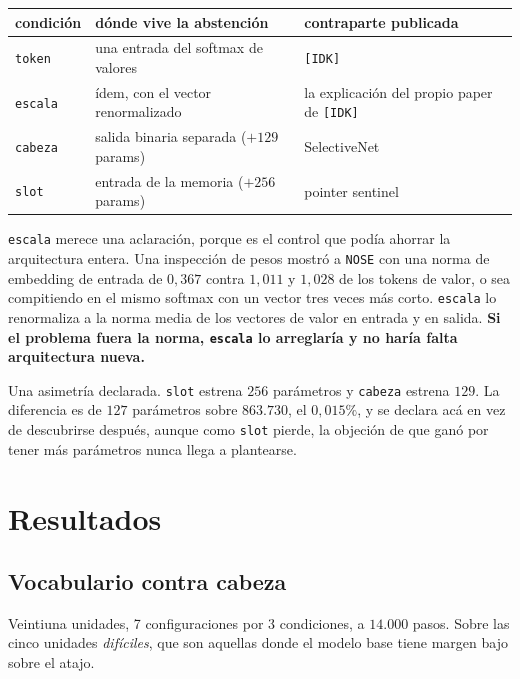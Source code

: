 \documentclass[11pt,a4paper]{article}
\begin{document}
\begin{center}
\small\begin{tabular}{lll}
\toprule
condición & dónde vive la abstención & contraparte publicada \\
\midrule
\texttt{token} & una entrada del softmax de valores & \texttt{[IDK]} \citep{cohen2024idk} \\
\texttt{escala} & ídem, con el vector renormalizado & la explicación del propio paper de \texttt{[IDK]} \\
\texttt{cabeza} & salida binaria separada ($+129$ params) & SelectiveNet \citep{geifman2019selectivenet} \\
\texttt{slot} & entrada de la memoria ($+256$ params) & pointer sentinel \citep{merity2016pointer} \\
\bottomrule
\end{tabular}
\end{center}

\texttt{escala} merece una aclaración, porque es el control que podía ahorrar la arquitectura entera.
Una inspección de pesos mostró a \texttt{NOSE} con una norma de embedding de entrada de $0{,}367$
contra $1{,}011$ y $1{,}028$ de los tokens de valor, o sea compitiendo en el mismo softmax con un
vector tres veces más corto. \texttt{escala} lo renormaliza a la norma media de los vectores de valor
en entrada y en salida. \textbf{Si el problema fuera la norma, \texttt{escala} lo arreglaría y no
haría falta arquitectura nueva.}

Una asimetría declarada. \texttt{slot} estrena $256$ parámetros y \texttt{cabeza} estrena $129$. La
diferencia es de $127$ parámetros sobre $863{.}730$, el $0{,}015\%$, y se declara acá en vez de
descubrirse después, aunque como \texttt{slot} pierde, la objeción de que ganó por tener más
parámetros nunca llega a plantearse.

\section{Resultados}

\subsection{Vocabulario contra cabeza}

Veintiuna unidades, 7 configuraciones por 3 condiciones, a $14{.}000$ pasos. Sobre las cinco unidades
\emph{difíciles}, que son aquellas donde el modelo base tiene margen bajo sobre el atajo.
\end{document}
